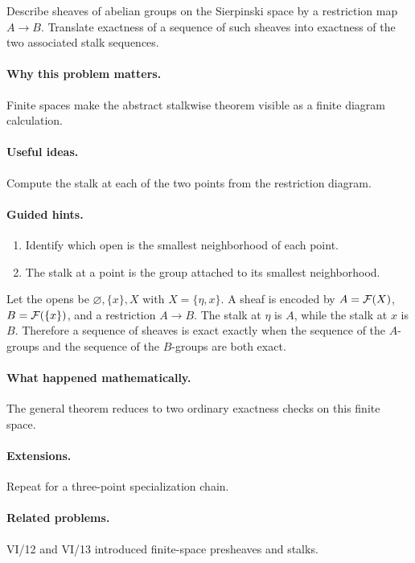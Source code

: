 \begin{problem}\label{prob:vi16-p18}
Describe sheaves of abelian groups on the Sierpinski space by a restriction map $A\to B$.  Translate exactness of a sequence of such sheaves into exactness of the two associated stalk sequences.
\end{problem}

\ifdefined\FullProblemDossiers
\paragraph{Why this problem matters.}
Finite spaces make the abstract stalkwise theorem visible as a finite diagram calculation.

\paragraph{Useful ideas.}
Compute the stalk at each of the two points from the restriction diagram.

\paragraph{Guided hints.}
\begin{enumerate}
\item Identify which open is the smallest neighborhood of each point.
\item The stalk at a point is the group attached to its smallest neighborhood.
\end{enumerate}

\begin{solution}
Let the opens be $\varnothing,\{x\},X$ with $X=\{\eta,x\}$.  A sheaf is encoded by $A=\mathcal F(X)$, $B=\mathcal F(\{x\})$, and a restriction $A\to B$.  The stalk at $\eta$ is $A$, while the stalk at $x$ is $B$.  Therefore a sequence of sheaves is exact exactly when the sequence of the $A$-groups and the sequence of the $B$-groups are both exact.
\end{solution}

\paragraph{What happened mathematically.}
The general theorem reduces to two ordinary exactness checks on this finite space.

\paragraph{Extensions.}
Repeat for a three-point specialization chain.

\paragraph{Related problems.}
VI/12 and VI/13 introduced finite-space presheaves and stalks.
\fi
